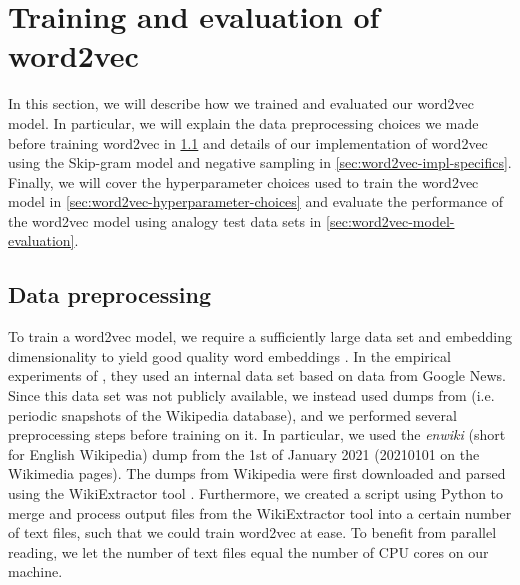 \section{Training and evaluation of word2vec}
\label{sec:training-and-eval-our-word2vec-impl}
In this section, we will describe how we trained and evaluated our word2vec model. In particular, we will explain the data preprocessing choices we made before training word2vec in \cref{sec:word2vec-data-preprocessing} and details of our implementation of word2vec using the Skip-gram model and negative sampling in \cref{sec:word2vec-impl-specifics}. Finally, we will cover the hyperparameter choices used to train the word2vec model in \cref{sec:word2vec-hyperparameter-choices} and evaluate the performance of the word2vec model using analogy test data sets in \cref{sec:word2vec-model-evaluation}.

\subsection{Data preprocessing}
\label{sec:word2vec-data-preprocessing}
To train a word2vec model, we require a sufficiently large data set and embedding dimensionality to yield good quality word embeddings \cite{mikolov2013b}. In the empirical experiments of \cite{mikolov2013b}, they used an internal data set based on data from Google News. Since this data set was not publicly available, we instead used dumps from \cite{WikimediaDumps} (i.e. periodic snapshots of the Wikipedia database), and we performed several preprocessing steps before training on it. In particular, we used the \textit{enwiki} (short for English Wikipedia) dump from the 1st of January 2021 (20210101 on the Wikimedia pages). The dumps from Wikipedia were first downloaded and parsed using the WikiExtractor tool \cite{Wikiextractor2015}. Furthermore, we created a script using Python to merge and process output files from the WikiExtractor tool into a certain number of text files, such that we could train word2vec at ease. To benefit from parallel reading, we let the number of text files equal the number of CPU cores on our machine.

